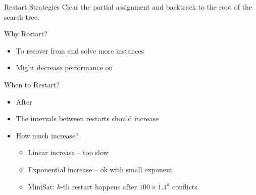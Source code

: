 \documentclass[t]{sdqbeamer}
\begin{document}
\begin{frame}{Restart Strategies}
Clear the partial assignment and backtrack to the root of the search tree.
\begin{block}{Why Restart?}
\begin{itemize}\setlength{\itemsep}{1ex}
	\item To recover from  and solve more instances
	\item Might decrease performance on 
\end{itemize}
\end{block}
\begin{block}{When to Restart?}
\begin{itemize}\setlength{\itemsep}{1ex}
	\item After 
	\item The intervals between restarts should increase 
	\item How much increase?
	\begin{itemize}\setlength{\itemsep}{1ex}
		\item Linear increase -- too slow
		\item Exponential increase -- ok with small exponent
		\item MiniSat: $k$-th restart happens after $100 \times 1.1^k$ conflicts
	\end{itemize}
\end{itemize}
\end{block}
\end{frame}
\end{document}
